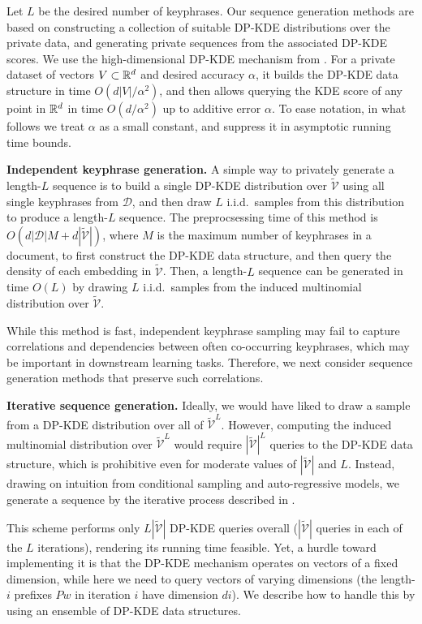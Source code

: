 Let $L$ be the desired number of keyphrases.  Our sequence generation methods are based on constructing a collection of suitable DP-KDE distributions over the private data, and generating private sequences from the associated DP-KDE scores. We use the high-dimensional DP-KDE mechanism from \cite{wagner2023fast}. 
For a private dataset of vectors $V\subset\mathbb R^d$ and desired accuracy $\alpha$, it builds the DP-KDE data structure in time $O(d|V|/\alpha^2)$, and then allows querying the KDE score of any point in $\mathbb R^d$ in time $O(d/\alpha^2)$ up to additive error $\alpha$. 
To ease notation, in what follows we treat $\alpha$ as a small constant, and suppress it in asymptotic running time bounds.

\noindent\textbf{Independent keyphrase generation.}
A simple way to privately generate a length-$L$ sequence is to build a single DP-KDE distribution over $\widetilde{\mathcal{V}}$ using all single keyphrases from $\mathcal{D}$, and then draw $L$ i.i.d.~samples from this distribution to produce a length-$L$ sequence. 
The preprocsessing time of this method is $O(d|\mathcal{D}|M+d|\widetilde{\mathcal{V}}|)$, where $M$ is the maximum number of keyphrases in a document, to first construct the DP-KDE data structure, and then query the density of each embedding in $\widetilde{\mathcal{V}}$. Then, a length-$L$ sequence can be generated in time $O(L)$ by drawing $L$ i.i.d.~samples from the induced multinomial distribution over $\widetilde{\mathcal{V}}$.

While this method is fast, independent keyphrase sampling may fail to capture correlations and dependencies between often co-occurring keyphrases, which may be important in downstream learning tasks. Therefore, we next consider sequence generation methods that preserve such correlations.

\noindent\textbf{Iterative sequence generation.}
Ideally, we would have liked to draw a sample from a DP-KDE distribution over all of $\widetilde{\mathcal{V}}^L$. However, computing the induced multinomial distribution over $\widetilde{\mathcal{V}}^L$ would require $|\widetilde{\mathcal{V}}|^L$ queries to the DP-KDE data structure, which is prohibitive even for moderate values of $|\widetilde{\mathcal{V}}|$ and $L$. 
Instead, drawing on intuition from conditional sampling and auto-regressive models, we generate a sequence by the iterative process described in .

This scheme performs only $L|\widetilde{\mathcal{V}}|$ DP-KDE queries overall ($|\widetilde{\mathcal{V}}|$ queries in each of the $L$ iterations), rendering its running time feasible. 
%
Yet, a hurdle toward implementing it is that the DP-KDE mechanism operates on vectors of a fixed dimension, while here we need to query vectors of varying dimensions (the length-$i$ prefixes $Pw$ in iteration $i$ have dimension $di$). 
We describe how to handle this by using an ensemble of DP-KDE data structures. 

